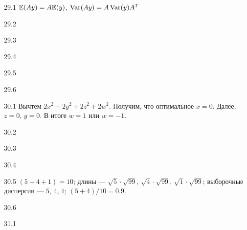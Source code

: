 \protect \hypertarget {soln:29.1}{}
\begin{solution}{{29.1}}
$\mathbb{E}(Ay)=A\mathbb{E}(y)$, $\operatorname{Var}(Ay)=A\operatorname{Var}(y)A^T$
\end{solution}
\protect \hypertarget {soln:29.2}{}
\begin{solution}{{29.2}}

\end{solution}
\protect \hypertarget {soln:29.3}{}
\begin{solution}{{29.3}}

\end{solution}
\protect \hypertarget {soln:29.4}{}
\begin{solution}{{29.4}}

\end{solution}
\protect \hypertarget {soln:29.5}{}
\begin{solution}{{29.5}}

\end{solution}
\protect \hypertarget {soln:29.6}{}
\begin{solution}{{29.6}}

\end{solution}
\protect \hypertarget {soln:30.1}{}
\begin{solution}{{30.1}}
Вычтем $2x^2 + 2y^2 + 2z^2 + 2w^2$. Получим, что оптимальное $x=0$. Далее, $z=0$, $y=0$. В итоге $w=1$ или $w=-1$.
\end{solution}
\protect \hypertarget {soln:30.2}{}
\begin{solution}{{30.2}}
\end{solution}
\protect \hypertarget {soln:30.3}{}
\begin{solution}{{30.3}}
\end{solution}
\protect \hypertarget {soln:30.4}{}
\begin{solution}{{30.4}}
\end{solution}
\protect \hypertarget {soln:30.5}{}
\begin{solution}{{30.5}}
$(5+4+1)=10$; длины — $\sqrt{5}\cdot\sqrt{99}$, $\sqrt{4}\cdot\sqrt{99}$, $\sqrt{1}\cdot\sqrt{99}$; выборочные дисперсии — $5$, $4$, $1$; $(5+4)/10=0.9$.
\end{solution}
\protect \hypertarget {soln:30.6}{}
\begin{solution}{{30.6}}
\end{solution}
\protect \hypertarget {soln:31.1}{}
\begin{solution}{{31.1}}
  
\end{solution}
\protect \hypertarget {soln:31.2}{}
